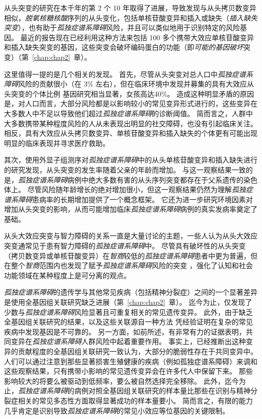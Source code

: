 从头突变的研究在本千年的第 2 个 10 年取得了进展，导致发现与从头拷贝数变异相似，\textit{脱氧核糖核酸}序列的从头变化，包括单核苷酸变异和插入或缺失（\textit{插入缺失突变}），也有助于\textit{孤独症谱系障碍}风险，并且可以类似地用于识别特定的风险基因。
最近的报告现在已经利用这种方法来包括 100 多个携带大效应单核苷酸变异和插入缺失突变的基因，这些突变会破坏编码蛋白的功能（即\textit{可能的基因破坏}突变）（第~\ref{chap:chap2}~章）。


这里值得一提的是几个相关的发现。
首先，尽管从头突变对总人口中\textit{孤独症谱系障碍}风险的贡献很小（在 3\% 左右），但在临床环境中发现并募集的具有大效应从头突变的个体比例 基因研究相当显著，女孩高达40\%。
造成这种明显矛盾的原因是，对人口而言，大部分风险都是以影响较小的常见变异形式进行的，这些变异在大多数人中不足以导致他们超过\textit{孤独症谱系障碍}的诊断阈值。
简而言之，人群中大多数携带某种程度风险的人从未表现出明显的社交障碍，也没有引起临床关注。
相反，具有大效应从头拷贝数变异、单核苷酸变异和插入缺失的个体更有可能出现明显的临床表现并寻求医疗救助。


其次，使用外显子组测序对\textit{孤独症谱系障碍}中的从头单核苷酸变异和插入缺失进行的研究发现，从头突变的发生率随着父亲的年龄而增加。
与这一观察结果一致的是，\textit{孤独症谱系障碍}病例中绝大多数有害的从头序列突变都存在于父系遗传的染色体上。
尽管风险随年龄增长的绝对增加很小，但这一观察结果仍然为理解\textit{孤独症谱系障碍}患病率的长期增加提供了一个概念框架。
它还为进一步研究环境因素对增加从头突变的影响，从而可能增加临床\textit{孤独症谱系障碍}病例的真实发病率奠定了基础。


从头大效应突变与智力障碍的关系一直是大量讨论的主题，一些人认为从头大效应突变通常见于患有智力障碍的\textit{孤独症谱系障碍}中。
尽管具有破坏性的从头突变（拷贝数变异或单核苷酸变异）在\textit{智商}较低的\textit{孤独症谱系障碍}患者中更为普遍，但在整个\textit{智商}范围内也发现了赋予\textit{孤独症谱系障碍}风险的突变 ，强化了认知和社会功能领域在某种程度上是可分离的观点。


\textit{孤独症谱系障碍}的遗传学与其他常见疾病（包括精神分裂症）之间的一个显著差异是使用全基因组关联研究缺乏进展（第~\ref{chap:chap2}~章）。
迄今为止，仅发现了少数与\textit{孤独症谱系障碍}风险显著且可重复相关的常见遗传变异。
此外，由于缺乏全基因组关联研究的结果，以及这些关联源自一种方法 凭经验证明在复杂的常见疾病中发现基因是不可靠的。
另一方面，如前所述，有非常有力的证据表明，共同变异在\textit{孤独症谱系障碍}人群风险中起着重要作用。
事实上，已经推断出这种变异的贡献程度的全基因组关联研究一致认为，大部分的脆弱性存在于共同变异中。
人们可以通过注意到那些显著损害生殖健康的疾病（例如孤独症谱系障碍）来调和这些观察结果，只有携带小影响的常见遗传变异会在许多代人中保留下来。
那些影响较大的将要么被驱动到低频率，要么被自然选择完全移除。
此外，迄今为止，\textit{孤独症谱系障碍}的病例对照全基因组关联研究的样本量比那些在识别与精神分裂症相关的常见多态性方面取得显著成功的样本量要小。
简而言之，有限的能力几乎肯定是识别导致\textit{孤独症谱系障碍}的常见小效应等位基因的关键限制。


